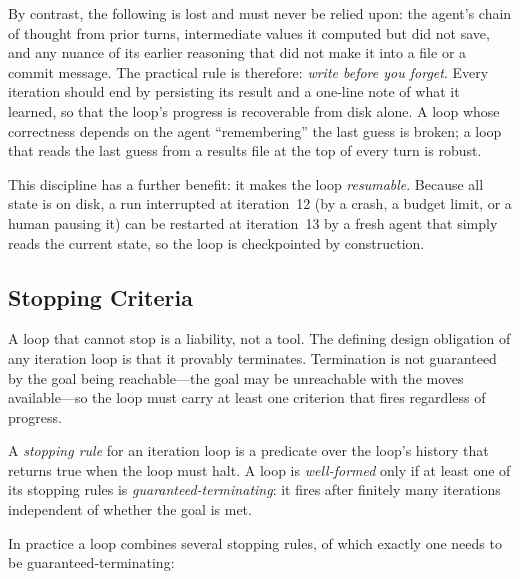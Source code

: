 By contrast, the following is lost and must never be relied upon: the agent's
chain of thought from prior turns, intermediate values it computed but did not
save, and any nuance of its earlier reasoning that did not make it into a file or
a commit message. The practical rule is therefore: \emph{write before you forget}.
Every iteration should end by persisting its result and a one-line note of what it
learned, so that the loop's progress is recoverable from disk alone. A loop whose
correctness depends on the agent ``remembering'' the last guess is broken; a loop
that reads the last guess from a results file at the top of every turn is robust.

This discipline has a further benefit: it makes the loop \emph{resumable}. Because
all state is on disk, a run interrupted at iteration~12 (by a crash, a budget
limit, or a human pausing it) can be restarted at iteration~13 by a fresh agent
that simply reads the current state, so the loop is checkpointed by construction.

\subsection{Stopping Criteria}\label{subsec:stopping-criteria}

A loop that cannot stop is a liability, not a tool. The defining design
obligation of any iteration loop is that it provably terminates. Termination is
not guaranteed by the goal being reachable---the goal may be unreachable with the
moves available---so the loop must carry at least one criterion that fires
regardless of progress.

\begin{definition}\label{def:stopping-rule}
A \emph{stopping rule} for an iteration loop is a predicate over the loop's
history that returns true when the loop must halt. A loop is \emph{well-formed}
only if at least one of its stopping rules is \emph{guaranteed-terminating}: it
fires after finitely many iterations independent of whether the goal is met.
\end{definition}

In practice a loop combines several stopping rules, of which exactly one needs to
be guaranteed-terminating:

